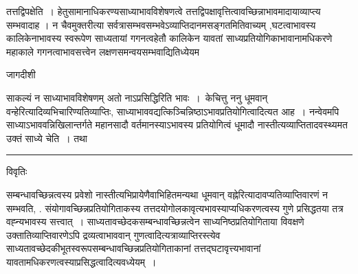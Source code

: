 \documentclass[10pt, openany]{book}
\begin{document}
{तत्तद्विपक्षेति~। हेतुसामानाधिकरण्यसाध्याभावविशेषणत्वे तत्तद्विपक्षावृत्तित्वावच्छिन्नाभावमादायाव्याप्त्य  सम्भवादाह । न चैवमुक्तरीत्या सर्वत्रासम्भवसम्भवेऽव्याप्तिदानमसङ्गतमितिवाच्यम् ,घटत्वाभावस्य कालिकेनाभावस्य स्वरूपेण साध्यतायां गगनत्वहेतौ कालिकेन यावतां
साध्यप्रतियोगिकाभावानामधिकरणे महाकाले गगनत्वाभावसत्त्वेन लक्षणसमन्वयसम्भवाद्यितिध्येयम
\newpage
\begin{center} जागदीशी \end{center}
{\la साकल्यं न साध्याभावविशेषणम् अतो नाऽप्रसिद्धिरिति भावः~।~{\la केचित्तु} ननु धूमवान् वन्हेरित्यादिव्यभिचारिण्यतिव्याप्तिः, साध्याभाववद्यत्किञ्चिन्निष्ठाऽभावप्रतियोगित्वादित्यत आह~। नन्वेवमपि साध्याऽभाववन्निखिलान्तर्गते महानसादौ वर्तमानस्याऽभावस्य प्रतियोगित्वं धूमादौ नास्तीत्यव्याप्तितादवस्थ्यमत उक्तं साध्ये चेति~। तथा}\\
\hrule
\begin{center}     विवृतिः \end{center}
सम्बन्धावच्छिन्नत्वस्य प्रवेशो नास्तीत्यभिप्रायेणैवाभिहितमन्यथा धूमवान् वह्नेरित्यादावप्यतिव्याप्तिवारणं न सम्भवति, . संयोगावच्छिन्नप्रतियोगिताकस्य
तत्तदयोगोलकावृत्यभावस्याप्यधिकरणत्वस्य गुणे प्रसिद्धतया तत्र वह्न्यभावस्य सत्त्वात्~। साध्यतावच्छेदकसम्बन्धावच्छिन्नत्वेन साध्यनिष्ठप्रतियोगिताया
विवक्षणे उक्तातिव्याप्तिवारणेऽपि द्रव्यत्वाभाववान् गुणत्वादित्यत्राव्याप्तिरस्त्येव साध्यतावच्छेदकीभूतस्वरूपसम्बन्धावच्छिन्नप्रतियोगिताकानां तत्तद्घटावृत्त्यभावानां यावतामधिकरणत्वस्याप्रसिद्धत्वादित्यवध्येयम्~।\\

}
\end{document}

